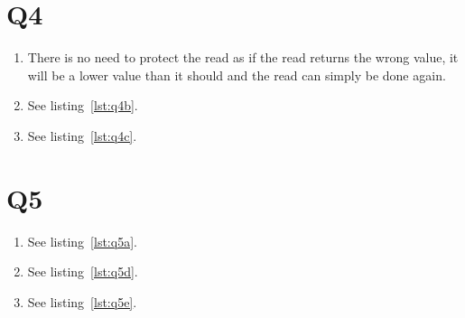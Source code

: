 \documentclass[a4paper]{article}
\begin{document}
\section*{Q4} %
\begin{enumerate}
\item %
There is no need to protect the read as if the read returns the wrong value, it will be a lower value than it should and the read can simply be done again.
\item %
See listing~\ref{lst:q4b}.

\item %
See listing~\ref{lst:q4c}.
\end{enumerate}




\section*{Q5} %
\begin{enumerate}
\item %
See listing~\ref{lst:q5a}.
\setcounter{enumi}{3}
\item %
See listing~\ref{lst:q5d}.
\item %
See listing~\ref{lst:q5e}.
\end{enumerate}







\end{document}
